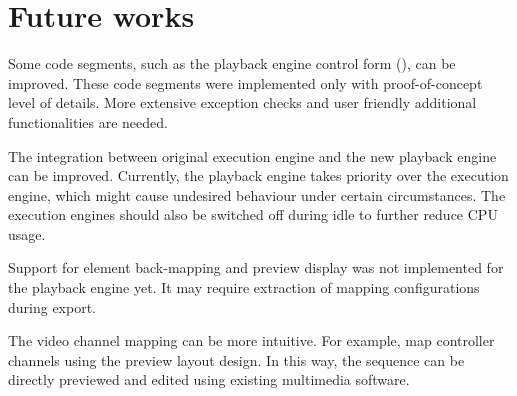 \section{Future works}

Some code segments, such as the playback engine control form (), can be improved. These code segments were implemented only with proof-of-concept level of details. More extensive exception checks and user friendly additional functionalities are needed.

The integration between original execution engine and the new playback engine can be improved. Currently, the playback engine takes priority over the execution engine, which might cause undesired behaviour under certain circumstances. The execution engines should also be switched off during idle to further reduce CPU usage.

Support for element back-mapping and preview display was not implemented for the playback engine yet. It may require extraction of mapping configurations during export.

The video channel mapping can be more intuitive. For example, map controller channels using the preview layout design. In this way, the sequence can be directly previewed and edited using existing multimedia software.
